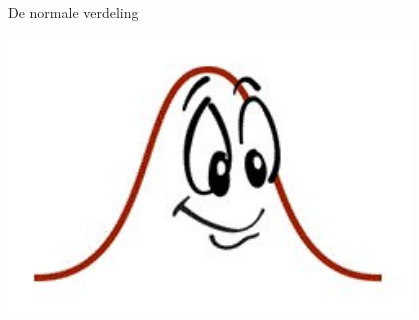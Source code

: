 \documentclass[12pt,twoside]{article}
\begin{document}
\thispagestyle{empty}
\begin{center}
  \begin{mdframed}
  \centering
  \fontsize{50}{70}\selectfont De normale verdeling
  \end{mdframed}
  \vfill
  \includegraphics[width=0.8\textwidth]{normal}
  \vfill
\end{center}
\vspace*{-2cm}
\end{document}
